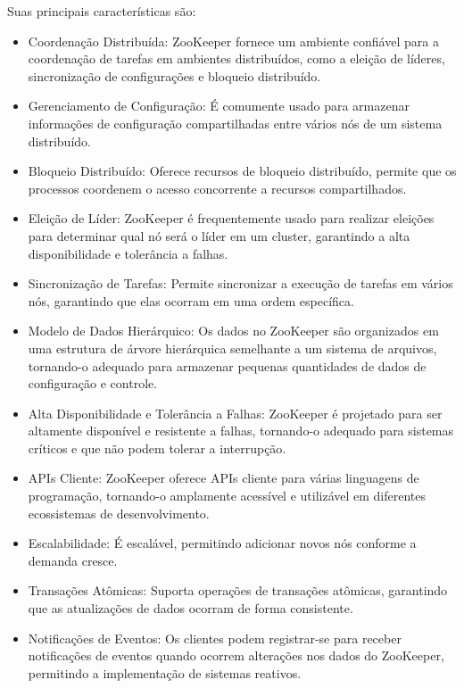 \documentclass[a4paper,11pt]{article}
\begin{document}
Suas principais características são: \vspace{-1em}
\begin{itemize}
	\item Coordenação Distribuída: ZooKeeper fornece um ambiente confiável para a coordenação de tarefas em ambientes distribuídos, como a eleição de líderes, sincronização de configurações e bloqueio distribuído.
	\item Gerenciamento de Configuração: É comumente usado para armazenar informações de configuração compartilhadas entre vários nós de um sistema distribuído.
	\item Bloqueio Distribuído: Oferece recursos de bloqueio distribuído, permite que os processos coordenem o acesso concorrente a recursos compartilhados.
	\item Eleição de Líder: ZooKeeper é frequentemente usado para realizar eleições para determinar qual nó será o líder em um cluster, garantindo a alta disponibilidade e tolerância a falhas.
	\item Sincronização de Tarefas: Permite sincronizar a execução de tarefas em vários nós, garantindo que elas ocorram em uma ordem específica.
	\item Modelo de Dados Hierárquico: Os dados no ZooKeeper são organizados em uma estrutura de árvore hierárquica semelhante a um sistema de arquivos, tornando-o adequado para armazenar pequenas quantidades de dados de configuração e controle.
	\item Alta Disponibilidade e Tolerância a Falhas: ZooKeeper é projetado para ser altamente disponível e resistente a falhas, tornando-o adequado para sistemas críticos e que não podem tolerar a interrupção.
	\item APIs Cliente: ZooKeeper oferece APIs cliente para várias linguagens de programação, tornando-o amplamente acessível e utilizável em diferentes ecossistemas de desenvolvimento.
	\item Escalabilidade: É escalável, permitindo adicionar novos nós conforme a demanda cresce.
	\item Transações Atômicas: Suporta operações de transações atômicas, garantindo que as atualizações de dados ocorram de forma consistente.
	\item Notificações de Eventos: Os clientes podem registrar-se para receber notificações de eventos quando ocorrem alterações nos dados do ZooKeeper, permitindo a implementação de sistemas reativos.
\end{itemize}
\end{document}
